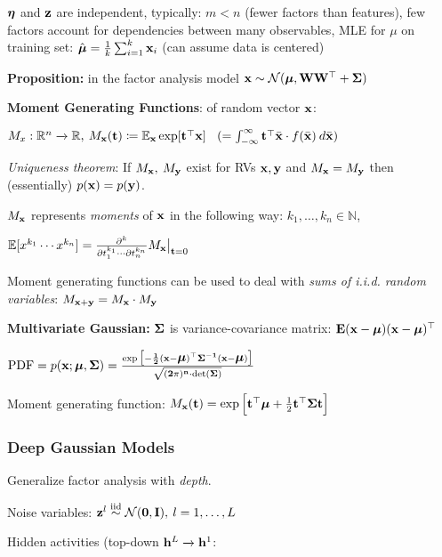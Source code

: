     \tab $\mbox{\boldmath $\eta$}$ and $\mathbf z$ are independent, typically: $m<n$ (fewer factors than features), few factors account for dependencies between many observables, MLE for $\mu$ on training set: $\hat{\mbox{\boldmath $\mu$}}=\frac{1}{k}\sum^k_{i=1}\mathbf x_i$ (can assume data is centered)
    
    \textbf{Proposition:} in the factor analysis model $\mathbf x \sim \mathcal{N}(\mbox{\boldmath $\mu$}, \mathbf W\mathbf W^\top+\bf{\Sigma})$
    
    \textbf{Moment Generating Functions}: of random vector $\mathbf x$:
    
    \tab $M_x:\mathbb R^n\xrightarrow{}\mathbb R,\> M_\mathbf x(\mathbf t)\coloneqq\mathbb E_{\mathbf x}\exp \lbrack \mathbf t^{\mathop{\mathrm{\top}}} \mathbf x \rbrack \>\>\>\>(= \int^\infty_{-\infty}\mathbf t^{\mathop{\mathrm{\top}}} \bar{\mathbf x} \cdot f(\bar{\mathbf x}) \> d\bar{\mathbf x})$
    
    \emph{Uniqueness theorem}: If $M_\mathbf x,\>M_\mathbf y$ exist for RVs $\mathbf x,\mathbf y$ and $M_\mathbf x=M_\mathbf y$ then (essentially) $p(\mathbf x)=p(\mathbf y)$.
    
    $M_\mathbf x$ represents \emph{moments} of $\mathbf x$ in the following way: $k_1,\ldots,k_n\in\mathbb{N}$,
    
    \tab $\mathbb E \lbrack x^{k_1} \cdots x^{k_n} \rbrack=\frac{\partial^k}{\partial t^{k_1}_1\cdots \partial t^{k_n}_n}M_\mathbf x \bigr|_{\mathbf t=0}$
    
    Moment generating functions can be used to deal with \emph{sums of i.i.d. random variables}: $M_{\mathbf x+\mathbf y}=M_\mathbf x \cdot M_\mathbf y$
    
    \textbf{Multivariate Gaussian:} $\bf{\Sigma}$ is variance-covariance matrix: $\mathbf E(\mathbf x-\mbox{\boldmath $\mu$})(\mathbf x-\mbox{\boldmath $\mu$})^\top$
    
    \tab $\text{PDF}=p(\mathbf x;\mbox{\boldmath $\mu$},\bf{\Sigma})=\frac{\exp\big[-\frac{1}{2}(\mathbf x-\mbox{\boldmath $\mu$})^\top\bf{\Sigma}^{-1}(\mathbf x-\mbox{\boldmath $\mu$})\big]}{\sqrt{(2\pi)^n \cdot \text{det}(\bf{\Sigma})}}$
    
    Moment generating function:
    $M_{\mathbf x}(\mathbf t)=\exp\Big[\mathbf t^\top\mbox{\boldmath $\mu$}+\frac{1}{2}\mathbf t^\top\bf{\Sigma}\mathbf t\Big]$
    
    
    \subsubsection{Deep Gaussian Models}
    \label{ssub:deepgaussianmodels}
    
    Generalize factor analysis with \emph{depth}. 
    
    Noise variables: $\mathbf z^l \overset{\text{iid}}{\sim} \mathcal{N}(\mathbf{0},\mathbf I),\>l=1,\ldots,L$
    
    Hidden activities (top-down $\mathbf h^L\xrightarrow{}\mathbf h^1$:
    
